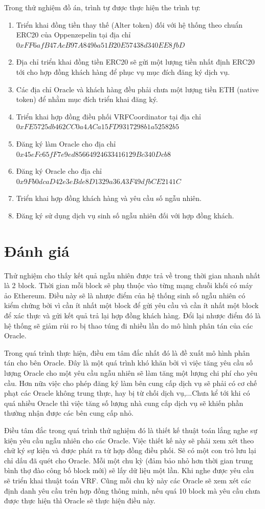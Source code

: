 \documentclass[../main.tex]{subfiles}
\begin{document}
Trong thử nghiệm đồ án, trình tự được thực hiện the trình tự:
\begin{enumerate}
    \item Triển khai đồng tiền thay thế (Alter token) đối với hệ thống theo chuẩn ERC20 của Oppenzepelin tại địa chỉ \\
    $0xFF6afB47AcB97A849ba51B20E57438d340EE8fbD$
    \item Địa chỉ triển khai đồng tiền ERC20 sẽ gửi một lượng tiền nhất định ERC20 tới cho hợp đồng khách hàng để phục vụ mục đích đăng ký dịch vụ.
    \item Các địa chỉ Oracle và khách hàng đều phải chưa một lượng tiền ETH (native token) để nhằm mục đích triển khai đăng ký.
    \item Triển khai hợp đồng điều phối VRFCoordinator tại địa chỉ\\
    $0xFE5725db462CC0a4ACa15FD9317298b1a52582b5$
    \item Đăng ký làm Oracle cho địa chỉ \\
    $0x45eFc65fF7e9ed85664924633416129Bc340Dcb8$
    \item Đăng ký Oracle cho địa chỉ \\
    $0x9Fb0dcaD42e3eBde8D1329a36A3F49dfbCE2141C$
    \item Triển khai hợp đồng khách hàng và yêu cầu số ngẫu nhiên.
    \item Đăng ký sử dụng dịch vụ sinh số ngẫu nhiên đối với hợp đồng khách.
\end{enumerate}
\section{Đánh giá}
Thử nghiệm cho thấy kết quả ngẫu nhiên được trả về trong thời gian nhanh nhất là 2 block. Thời gian mỗi block sẽ phụ thuộc vào từng mạng chuỗi khối có máy ảo Ethereum. Điều này sẽ là nhược điểm của hệ thống sinh số ngẫu nhiên có kiểm chứng bởi vì cần ít nhất một block để gửi yêu cầu và cần ít nhất một block để xác thực và gửi kết quả trả lại hợp đồng khách hàng. Đổi lại nhược điểm đó là hệ thống sẽ giảm rủi ro bị thao túng đi nhiều lần do mô hình phân tán của các Oracle.

Trong quá trình thực hiện, điều em tâm đắc nhất đó là đề xuất mô hình phân tán cho bên Oracle. Đây là một quá  trình khó khăn bởi vì việc tăng yêu cầu số lượng Oracle cho một yêu cầu ngẫu nhiên sẽ làm tăng một lượng chi phí cho yêu cầu. Hơn nữa việc cho phép đăng ký làm bên cung cấp dịch vụ sẽ phải có cơ chế phạt các Oracle không trung thực, hay bị từ chối dịch vụ,...Chưa kể tới khi có quá nhiều Oracle thì việc tăng số lượng nhà cung cấp dịch vụ sẽ khiến phần thường nhận được các bên cung cấp nhỏ. 

Điều tâm đắc trong quá trình thử nghiệm đó là thiết kế thuật toán lắng nghe sự kiện yêu cầu ngẫu nhiên cho các Oracle. Việc thiết kế này sẽ phải xem xét theo chữ ký sự kiện và được phát ra từ hợp đồng điều phối.
Sẽ có một con trỏ lưu lại chỉ dấu đã quét cho Oracle. Mỗi một chu kỳ (đảm bảo nhỏ hơn thời gian trung bình thợ đào công bố block mới) sẽ lấy dữ liệu một lần. Khi nghe được yêu cầu sẽ triển khai thuật toán VRF. Cũng mỗi chu kỳ này các Oracle sẽ xem xét các định danh yêu cầu trên hợp đồng thông minh, nếu quá 10 block mà yêu cầu chưa được thực hiện thì Oracle sẽ thực hiện điều này.
\end{document}
